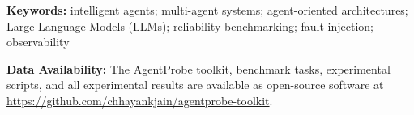 \documentclass[12pt,a4paper]{article}
\begin{document}
\vspace{1em}

\noindent\textbf{Keywords:} intelligent agents; multi-agent systems; agent-oriented architectures; Large Language Models (LLMs); reliability benchmarking; fault injection; observability

\vspace{1.5em}

{\noindent\textbf{Data Availability:} The AgentProbe toolkit, benchmark tasks, experimental scripts, and all experimental results are available as open-source software at\\\url{https://github.com/chhayankjain/agentprobe-toolkit}.}
\end{document}

